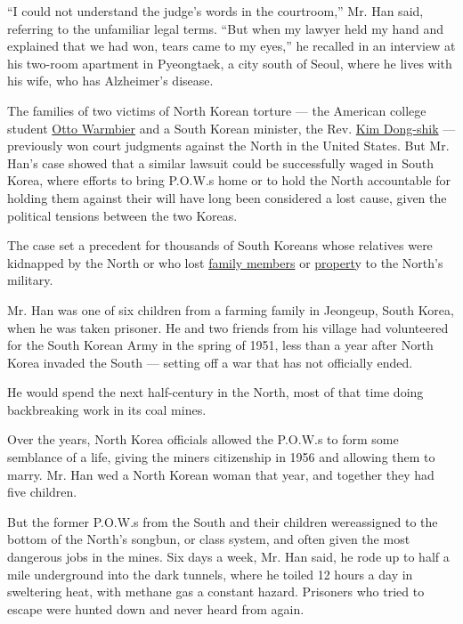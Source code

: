 ``I could not understand the judge's words in the courtroom,'' Mr. Han
said, referring to the unfamiliar legal terms​. ​``But when my lawyer
held my hand and explained that we had won, tears came to my eyes,'' he
recalled in an interview at his two-room apartment in Pyeongtaek, a city
south of Seoul, where he lives with his wife, who has Alzheimer's
disease.

The families of two victims of North Korean torture --- the American
college student
\href{https://www.nytimes.com/2018/12/24/us/otto-warmbier-north-korea.html?searchResultPosition=1}{Otto
Warmbier} and a South Korean minister, the Rev.
\href{https://www.nytimes.com/2015/04/16/world/asia/after-15-years-victory-of-sorts-for-family-of-pastor-believed-abducted-by-north-korea.html}{Kim
Dong-shik} --- previously won court judgments against the North in the
United States​. But Mr. Han's case showed that a similar lawsuit could
be successfully waged in South Korea, where efforts to bring P.O.W.s
home or to hold the North accountable for holding them against their
will have long been considered a lost cause, given the political
tensions between the two Koreas.

The case set a precedent for thousands of South Koreans whose relatives
were kidnapped by ​the ​North or who lost
\href{https://www.nytimes.com/2010/05/20/world/asia/20korea.html}{family
members} or
\href{https://www.nytimes.com/2020/07/17/world/asia/korea-kim-yo-jong-lawsuit.html}{propert}y
to ​the North's ​military.

Mr. Han was one of six children from a farming family in Jeongeup​,
South Korea, when he was taken prisoner. He and two friends from his
village had volunteered for the South Korean Army in the spring of 1951,
less than a year after North Korea invaded the South --- setting off a
war that has not officially ended.

He would spend the next half-century in the North, most of that time
doing backbreaking work in its coal mines.

Over the years, North Korea officials allowed the P.O.W.s to form some
semblance of a life, giving the miners citizenship in 1956 and allowing
them to marry. Mr. Han wed a North Korean woman that year, and together
they had five children.

But the former P.O.W.s from the South and their children were ​assigned
to the bottom of the North's songbun, or class system​, and often given
the most dangerous jobs in the mines. Six days a week, Mr. Han said, he
rode up to half a mile underground into the dark tunnels, where he
toiled 12 hours a day in sweltering heat, with methane gas a constant
hazard. Prisoners who tried to ​escape were hunted down and never heard
from again.

